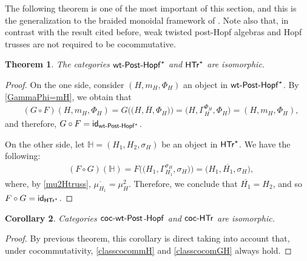\documentclass[pdftex]{sigma}
\numberwithin{equation}{section}
\newtheorem{Theorem}{Theorem}[section]
\newtheorem{Corollary}[Theorem]{Corollary}
\begin{document}
The following theorem is one of the most important of this section, and this is the generalization to the braided monoidal framework of \cite[Theorem 6.7]{Wang}. Note also that, in contrast with the result cited before, weak twisted post-Hopf algebras and Hopf trusses are not required to be cocommutative.
\begin{Theorem}\label{th-iso-wtph-htr}
The categories ${\sf wt}\textnormal{-}{\sf Post}\textnormal{-}{\sf Hopf}^{\star}$ and $\sf{HTr}^{\star}$ are isomorphic.
\end{Theorem}
\begin{proof}
On the one side, consider $(H,m_{H},\Phi_{H})$ an object in ${\sf wt}\textnormal{-}{\sf Post}\textnormal{-}{\sf Hopf}^{\star}$. By \eqref{GammaPhi=mH}, we obtain that
\begin{align*}
&(G\circ F)(H,m_{H},\Phi_{H})=G\bigl(\bigl(H,\overline{H},\Phi_{H}\bigr)\bigr)=\bigl(H,\Gamma_{H}^{\Phi_{H}},\Phi_{H}\bigr)=(H,m_{H},\Phi_{H}),
\end{align*}
and therefore, $G\circ F={\sf id}_{{\sf wt}\textnormal{-}{\sf Post}\textnormal{-}{\sf Hopf}^{\star}}$.

On the other side, let $\mathbb{H}=(H_{1},H_{2},\sigma_{H})$ be an object in $\sf{HTr}^{\star}$. We have the following:
\begin{align*}
&(F\circ G)(\mathbb{H})=F\bigl(\bigl(H_{1},\Gamma_{H_{1}}^{\sigma_{H}},\sigma_{H}\bigr)\bigr)=\bigl(H_{1},\overline{H_{1}},\sigma_{H}\bigr),
\end{align*}
where, by \eqref{mu2Htruss}, $\overline{\mu_{H_{1}}}=\mu_{H}^{2}$. Therefore, we conclude that $\overline{H_{1}}=H_{2}$, and so $F\circ G={\sf id}_{\sf{HTr}^{\star}}$.
\end{proof}

\begin{Corollary}\label{cor-iso-cocwtph-cochtr}
Categories $\sf{coc}\textnormal{-}{\sf wt}\textnormal{-}{\sf Post}$-$\sf{Hopf}$ and $\sf{coc}\textnormal{-}{\sf HTr}$ are isomorphic.
\end{Corollary}
\begin{proof}
By previous theorem, this corollary is direct taking into account that, under cocommutativity, \eqref{classcocommH} and \eqref{classcocomGH} always hold.
\end{proof}
\end{document}
